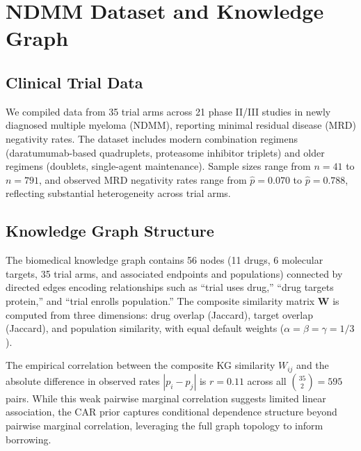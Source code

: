 \documentclass[12pt]{article}
\newcommand{\bW}{\mathbf{W}}
\begin{document}
\section{NDMM Dataset and Knowledge Graph}
\label{sec:data}

\subsection{Clinical Trial Data}

We compiled data from 35 trial arms across 21 phase II/III studies in newly diagnosed multiple myeloma (NDMM), reporting minimal residual disease (MRD) negativity rates. The dataset includes modern combination regimens (daratumumab-based quadruplets, proteasome inhibitor triplets) and older regimens (doublets, single-agent maintenance). Sample sizes range from $n = 41$ to $n = 791$, and observed MRD negativity rates range from $\hat{p} = 0.070$ to $\hat{p} = 0.788$, reflecting substantial heterogeneity across trial arms.

\subsection{Knowledge Graph Structure}

The biomedical knowledge graph contains 56 nodes (11 drugs, 6 molecular targets, 35 trial arms, and associated endpoints and populations) connected by directed edges encoding relationships such as ``trial uses drug,'' ``drug targets protein,'' and ``trial enrolls population.'' The composite similarity matrix $\bW$ is computed from three dimensions: drug overlap (Jaccard), target overlap (Jaccard), and population similarity, with equal default weights ($\alpha = \beta = \gamma = 1/3$).

The empirical correlation between the composite KG similarity $W_{ij}$ and the absolute difference in observed rates $|p_i - p_j|$ is $r = 0.11$ across all $\binom{35}{2} = 595$ pairs. While this weak pairwise marginal correlation suggests limited linear association, the CAR prior captures conditional dependence structure beyond pairwise marginal correlation, leveraging the full graph topology to inform borrowing.

\end{document}
